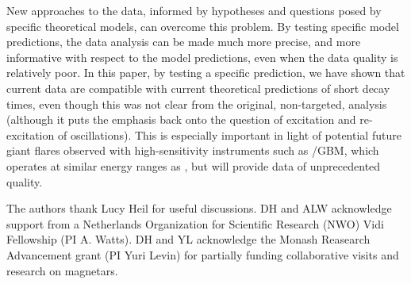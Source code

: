 \documentclass{emulateapj}
\begin{document}
New approaches to the data, informed by hypotheses and questions posed by specific theoretical models, can overcome this problem. By testing specific model predictions, the data analysis can be made much more precise, and more informative with respect to the model predictions, even when the data quality is relatively poor. In this paper, by testing a specific prediction, we have shown that current data are compatible with current theoretical predictions of short decay times, even though this was not clear from the original, non-targeted, analysis (although it puts the emphasis back onto the question of excitation and re-excitation of oscillations). This is especially important in light of potential future giant flares observed with high-sensitivity instruments such as \fermi/GBM, which operates at similar energy ranges as \rhessi, but will provide data of unprecedented quality.

\acknowledgments
The authors thank Lucy Heil for useful discussions.%
DH and ALW acknowledge support from a Netherlands Organization for Scientific Research (NWO) Vidi Fellowship (PI A. Watts).  
DH and YL acknowledge the Monash Reasearch Advancement grant (PI Yuri Levin) for partially funding collaborative visits
and research on magnetars.



\end{document}
